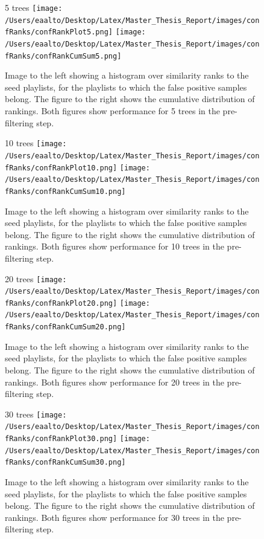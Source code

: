 \documentclass[a4paper,11pt]{kth-mag}
\begin{document}
\begin{figure}
5 trees
\texttt{[image: /Users/eaalto/Desktop/Latex/Master\_Thesis\_Report/images/confRanks/confRankPlot5.png]}
\texttt{[image: /Users/eaalto/Desktop/Latex/Master\_Thesis\_Report/images/confRanks/confRankCumSum5.png]}
\caption{Image to the left showing a histogram over similarity ranks to the seed playlists, for the playlists to which the false positive samples belong. The figure to the right shows the cumulative distribution of rankings. Both figures show performance for 5 trees in the pre-filtering step.}
\end{figure}

\begin{figure}
10 trees
\texttt{[image: /Users/eaalto/Desktop/Latex/Master\_Thesis\_Report/images/confRanks/confRankPlot10.png]}
\texttt{[image: /Users/eaalto/Desktop/Latex/Master\_Thesis\_Report/images/confRanks/confRankCumSum10.png]}
\caption{Image to the left showing a histogram over similarity ranks to the seed playlists, for the playlists to which the false positive samples belong. The figure to the right shows the cumulative distribution of rankings. Both figures show performance for 10 trees in the pre-filtering step.}
\end{figure}

\begin{figure}
20 trees
\texttt{[image: /Users/eaalto/Desktop/Latex/Master\_Thesis\_Report/images/confRanks/confRankPlot20.png]}
\texttt{[image: /Users/eaalto/Desktop/Latex/Master\_Thesis\_Report/images/confRanks/confRankCumSum20.png]}
\caption{Image to the left showing a histogram over similarity ranks to the seed playlists, for the playlists to which the false positive samples belong. The figure to the right shows the cumulative distribution of rankings. Both figures show performance for 20 trees in the pre-filtering step.}
\end{figure}

\begin{figure}
30 trees
\texttt{[image: /Users/eaalto/Desktop/Latex/Master\_Thesis\_Report/images/confRanks/confRankPlot30.png]}
\texttt{[image: /Users/eaalto/Desktop/Latex/Master\_Thesis\_Report/images/confRanks/confRankCumSum30.png]}
\caption{Image to the left showing a histogram over similarity ranks to the seed playlists, for the playlists to which the false positive samples belong. The figure to the right shows the cumulative distribution of rankings. Both figures show performance for 30 trees in the pre-filtering step.}
\end{figure}
\end{document}
